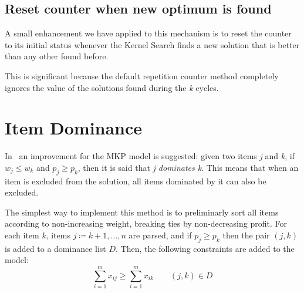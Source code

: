 \subsection{Reset counter when new optimum is found}
A small enhancement we have applied to this mechanism
is to reset the counter to its initial status
whenever the Kernel Search finds a new solution
that is better than any other found before.

This is significant because the default repetition counter
method completely ignores the value of the solutions found
during the \textit{k} cycles.


\section{Item Dominance}
In~\cite{mkp:2019} an improvement for the MKP model is suggested:
given two items \textit{j} and \textit{k}, if \(w_{j} \leq w_{k}\)
and \(p_{j} \geq p_{k}\), then it is said that \textit{j dominates k}.
This means that when an item is excluded from the solution,
all items dominated by it can also be excluded.

The simplest way to implement this method is to preliminarly sort all
items according to non-increasing weight, breaking ties by
non-decreasing profit.
For each item \(k\), items \(j \coloneqq k+1,\dots,n\) are parsed,
and if \(p_{j} \geq p_{k}\) then the pair \((j,k)\) is added to a
dominance list \(D\).
Then, the following constraints are added to the model:
\begin{equation}
    \label{eq:itemdom}
    \sum_{i=1}^{m} x_{ij} \geq \sum_{i=1}^{m} x_{ik} \qquad (j,k) \in D
\end{equation}

